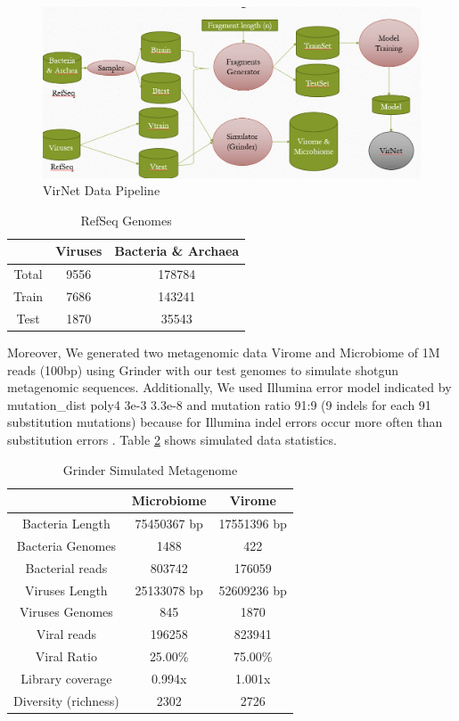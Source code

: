 \documentclass[conference]{IEEEtran}
\begin{document}
\begin{figure}
	\includegraphics[width=\linewidth]{imgs/data_pipeline.PNG}
	\caption{VirNet Data Pipeline}
	\label{fig:data_pipline}
\end{figure}

\begin{table}[h!]
	\centering
	\begin{tabular}{||c c c||} 
		& Viruses & Bacteria \& Archaea \\ [0.5ex] 
		\hline\hline
		Total & 9556  & 178784  \\ 
		Train & 7686  & 143241  \\
		Test & 1870  & 35543  \\ [1ex] 
	\end{tabular}
	\caption{RefSeq Genomes}
	\label{table:genome_stats}
\end{table}

Moreover, We generated two metagenomic data Virome and Microbiome of 1M reads (100bp) using Grinder \cite{angly2012grinder} with our test genomes to simulate shotgun metagenomic sequences. Additionally, We used Illumina error model indicated by mutation\_dist poly4 3e-3 3.3e-8 and mutation ratio 91:9 (9 indels for each 91 substitution mutations) because for Illumina indel errors occur more often than substitution errors \cite{laehnemann2015denoising}. Table \ref{table:simulate_stats} shows simulated data statistics.  \\

\begin{table}[h!]
	\centering
	\begin{tabular}{||c c c||} 
		& Microbiome & Virome \\ [0.5ex] 
		\hline\hline
		Bacteria Length & 75450367  bp  & 17551396 bp  \\
		Bacteria Genomes & 1488 & 422\\
		Bacterial reads & 803742 & 176059\\
		Viruses Length & 25133078 bp  & 52609236 bp  \\ 
		Viruses Genomes & 845 & 1870\\
		Viral reads & 196258 & 823941 \\  
		Viral Ratio & 25.00\% & 75.00\% \\ 
		Library coverage &  0.994x &  1.001x  \\
		Diversity (richness) & 2302 & 2726 \\ [1ex]
	\end{tabular}
	\caption{Grinder Simulated Metagenome}
	\label{table:simulate_stats}
\end{table}
\end{document}
